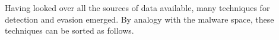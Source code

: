 Having looked over all the sources of data available, many techniques for detection and evasion emerged.
By analogy with the malware space, these techniques can be sorted as follows.

